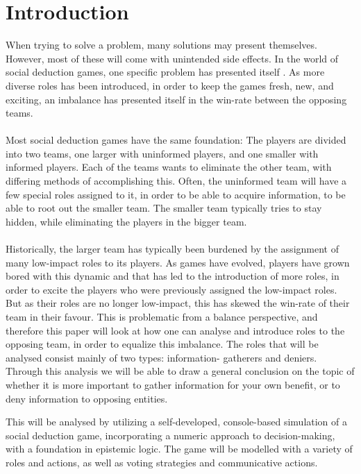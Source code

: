 \section{Introduction}
When trying to solve a problem, many solutions may present themselves. However,
most of these will come with unintended side effects. In the world of social
deduction games, one specific problem has presented itself . As more diverse roles has been introduced, in order to keep the games
fresh, new, and exciting, an imbalance has presented itself in the win-rate
between the opposing teams. \\ \\ Most social deduction games have the same
foundation: The players are divided into two teams, one larger with uninformed
players, and one smaller with informed players. Each of the teams wants to
eliminate the other team, with differing methods of accomplishing this. Often,
the uninformed team will have a few special roles assigned to it, in order to
be able to acquire information, to be able to root out the smaller team. The
smaller team typically tries to stay hidden, while eliminating the players in
the bigger team.\\ \\ Historically, the larger team has typically been burdened
by the assignment of many low-impact roles to its players. As games have
evolved, players have grown bored with this dynamic and that has led to the
introduction of more roles, in order to excite the players who were previously
assigned the low-impact roles. But as their roles are no longer low-impact,
this has skewed the win-rate of their team in their favour. This is problematic
from a balance perspective, and therefore this paper will look at how one can
analyse and introduce roles to the opposing team, in order to equalize this
imbalance. The roles that will be analysed consist mainly of two types:
information- gatherers and deniers. Through this analysis we will be able to
draw a general conclusion on the topic of whether it is more important to
gather information for your own benefit, or to deny information to opposing
entities.

This will be analysed by utilizing a self-developed, console-based simulation
of a social deduction game, incorporating a numeric approach to
decision-making, with a foundation in epistemic logic. The game will be
modelled with a variety of roles and actions, as well as voting strategies and
communicative actions.

